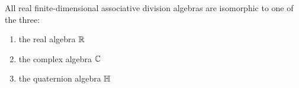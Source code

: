 \begin{theorem}[Frobenius]
	All real finite-dimensional associative division algebras are isomorphic to one of the three:
	\begin{enumerate}
		\item the real algebra $\mathbb{R}$
		\item the complex algebra $\mathbb{C}$
		\item the quaternion algebra $\mathbb{H}$
	\end{enumerate}
\end{theorem}
